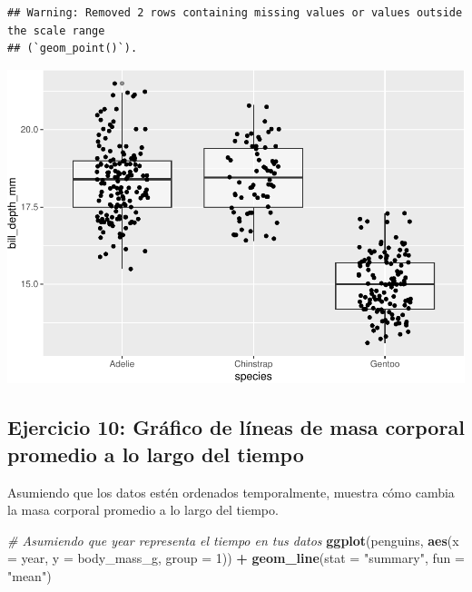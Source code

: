 \documentclass[
]{book}
\newenvironment{Shaded}{\begin{snugshade}}{\end{snugshade}}
\newcommand{\AttributeTok}[1]{\textcolor[rgb]{0.13,0.29,0.53}{#1}}
\newcommand{\CommentTok}[1]{\textcolor[rgb]{0.56,0.35,0.01}{\textit{#1}}}
\newcommand{\DecValTok}[1]{\textcolor[rgb]{0.00,0.00,0.81}{#1}}
\newcommand{\FunctionTok}[1]{\textcolor[rgb]{0.13,0.29,0.53}{\textbf{#1}}}
\newcommand{\NormalTok}[1]{#1}
\newcommand{\SpecialCharTok}[1]{\textcolor[rgb]{0.81,0.36,0.00}{\textbf{#1}}}
\newcommand{\StringTok}[1]{\textcolor[rgb]{0.31,0.60,0.02}{#1}}
\begin{document}
\begin{verbatim}
## Warning: Removed 2 rows containing missing values or values outside the scale range
## (`geom_point()`).
\end{verbatim}

\includegraphics{bookdown-demo_files/figure-latex/unnamed-chunk-185-1.pdf}

\hypertarget{ejercicio-10-gruxe1fico-de-luxedneas-de-masa-corporal-promedio-a-lo-largo-del-tiempo}{%
\subsection{Ejercicio 10: Gráfico de líneas de masa corporal promedio a lo largo del tiempo}\label{ejercicio-10-gruxe1fico-de-luxedneas-de-masa-corporal-promedio-a-lo-largo-del-tiempo}}

Asumiendo que los datos estén ordenados temporalmente, muestra cómo cambia la masa corporal promedio a lo largo del tiempo.

\begin{Shaded}
\begin{Highlighting}[]
\CommentTok{\# Asumiendo que \textquotesingle{}year\textquotesingle{} representa el tiempo en tus datos}
\FunctionTok{ggplot}\NormalTok{(penguins, }\FunctionTok{aes}\NormalTok{(}\AttributeTok{x =}\NormalTok{ year, }\AttributeTok{y =}\NormalTok{ body\_mass\_g, }\AttributeTok{group =} \DecValTok{1}\NormalTok{)) }\SpecialCharTok{+}
  \FunctionTok{geom\_line}\NormalTok{(}\AttributeTok{stat =} \StringTok{"summary"}\NormalTok{, }\AttributeTok{fun =} \StringTok{"mean"}\NormalTok{)}
\end{Highlighting}
\end{Shaded}
\end{document}
